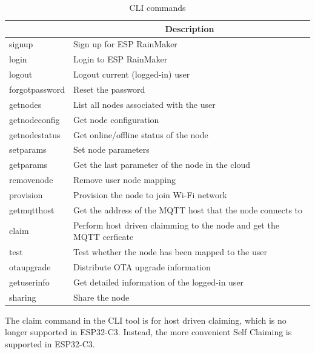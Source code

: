 \documentclass[a4paper,12pt,openany]{book}
\renewcommand{\ttfamily}{\fontfamily{pcr}\selectfont}
\renewcommand{\arraystretch}{1}
\begin{document}
\begin{table}[h!]
    \renewcommand{\arraystretch}{1.15}
    \caption{CLI commands}
    \begin{tabular}{|>{\ttfamily\small}m{8em}|m{31em}|}
        \hline
        \rowcolor{LightBlue} \multicolumn{1}{|c|}{\textbf{Command}}&\multicolumn{1}{c|}{\textbf{Description}}\\
        \hline
        signup&Sign up for ESP RainMaker\\
        \hline
        login&Login to ESP RainMaker\\
        \hline
        logout&Logout current (logged-in) user\\
        \hline
        forgotpassword&Reset the password\\
        \hline
        getnodes&List all nodes associated with the user\\
        \hline
        getnodeconfig&Get node configuration\\
        \hline
        getnodestatus&Get online/offline status of the node\\
        \hline
        setparams&Set node parameters\\
        \hline
        getparams&Get the last parameter of the node in the cloud\\
        \hline
        removenode&Remove user node mapping\\
        \hline
        provision&Provision the node to join Wi-Fi network\\
        \hline
        getmqtthost&Get the address of the MQTT host that the node connects to\\
        \hline
        claim&Perform host driven claimming to the node and get the MQTT cerficate\\
        \hline
        test&Test whether the node has been mapped to the user\\
        \hline
        otaupgrade&Distribute OTA upgrade information\\
        \hline
        getuserinfo&Get detailed information of the logged-in user\\
        \hline
        sharing&Share the node\\
        \hline
    \end{tabular}
\end{table}

The claim command in the CLI tool is for host driven claiming, which is no longer supported in ESP32-C3. Instead, the more convenient Self Claiming is supported in ESP32-C3.
\end{document}
